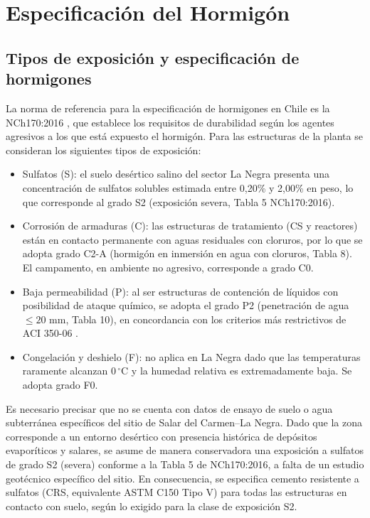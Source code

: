 \section{Especificación del Hormigón}
\label{sec:especificacion_hormigon}

\subsection{Tipos de exposición y especificación de hormigones}

La norma de referencia para la especificación de hormigones en Chile es la NCh170:2016 \cite{NCh170}, que establece los requisitos de durabilidad según los agentes agresivos a los que está expuesto el hormigón. Para las estructuras de la planta se consideran los siguientes tipos de exposición:

\begin{itemize}
    \item Sulfatos (S): el suelo desértico salino del sector La Negra presenta una concentración de sulfatos solubles estimada entre 0{,}20\% y 2{,}00\% en peso, lo que corresponde al grado S2 (exposición severa, Tabla 5 NCh170:2016).
    \item Corrosión de armaduras (C): las estructuras de tratamiento (CS y reactores) están en contacto permanente con aguas residuales con cloruros, por lo que se adopta grado C2-A (hormigón en inmersión en agua con cloruros, Tabla 8). El campamento, en ambiente no agresivo, corresponde a grado C0.
    \item Baja permeabilidad (P): al ser estructuras de contención de líquidos con posibilidad de ataque químico, se adopta el grado P2 (penetración de agua $\leq 20$ mm, Tabla 10), en concordancia con los criterios más restrictivos de ACI 350-06 \cite{ACI350}.
    \item Congelación y deshielo (F): no aplica en La Negra dado que las temperaturas raramente alcanzan 0\,$^\circ$C y la humedad relativa es extremadamente baja. Se adopta grado F0.
\end{itemize}

Es necesario precisar que no se cuenta con datos de ensayo de suelo o agua subterránea específicos del sitio de Salar del Carmen--La Negra. Dado que la zona corresponde a un entorno desértico con presencia histórica de depósitos evaporíticos y salares, se asume de manera conservadora una exposición a sulfatos de grado S2 (severa) conforme a la Tabla 5 de NCh170:2016, a falta de un estudio geotécnico específico del sitio. En consecuencia, se especifica cemento resistente a sulfatos (CRS, equivalente ASTM C150 Tipo V) para todas las estructuras en contacto con suelo, según lo exigido para la clase de exposición S2.


